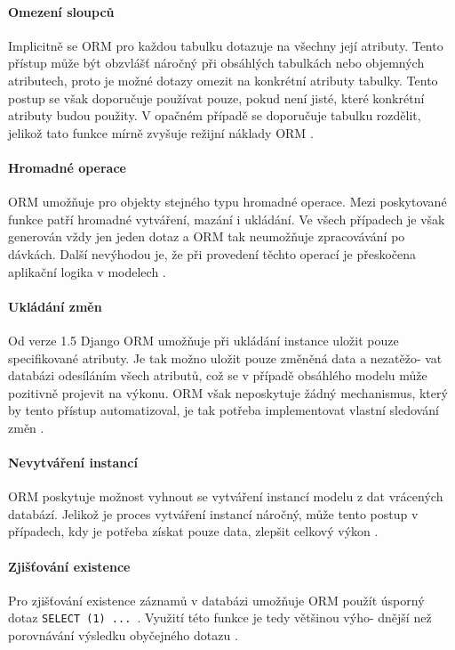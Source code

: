 \documentclass[ing,male,java,dept456]{diploma}						%
\begin{document}
\paragraph{Omezení sloupců}

Implicitně se ORM pro každou tabulku dotazuje na všechny její atributy. Tento přístup může být obzvlášť náročný při obsáhlých tabulkách nebo objemných atributech, proto je možné dotazy omezit na konkrétní atributy tabulky. Tento postup se však doporučuje používat pouze, pokud není jisté, které konkrétní atributy budou použity. V opačném případě se doporučuje tabulku rozdělit, jelikož tato funkce mírně zvyšuje režijní náklady ORM \cite{dj-querysets}. %

\paragraph{Hromadné operace}

ORM umožňuje pro objekty stejného typu hromadné operace. Mezi poskytované funkce patří hromadné vytváření, mazání i ukládání. Ve všech případech je však generován vždy jen jeden dotaz a ORM tak neumožňuje zpracovávání po dávkách. Další nevýhodou je, že při provedení těchto operací je přeskočena aplikační logika v modelech \cite{dj-queries}. %

\paragraph{Ukládání změn} Od verze 1.5 Django ORM umožňuje při ukládání instance uložit pouze specifikované atributy. Je tak možno uložit pouze změněná data a nezatěžo- vat databázi odesíláním všech atributů, což se v případě obsáhlého modelu může pozitivně projevit na výkonu. ORM však neposkytuje žádný mechanismus, který by tento přístup automatizoval, je tak potřeba implementovat vlastní sledování změn \cite{dj-save}.

\paragraph{Nevytváření instancí} ORM poskytuje možnost vyhnout se vytváření instancí modelu z dat vrácených databází. Jelikož je proces vytváření instancí náročný, může tento postup v případech, kdy je potřeba získat pouze data, zlepšit celkový výkon \cite{dj-querysets}. %

\paragraph{Zjišťování existence} Pro zjišťování existence záznamů v databázi umožňuje ORM použít úsporný dotaz \lstinline[style=inlinepython]|SELECT (1) ... |. Využití této funkce je tedy většinou výho- dnější než porovnávání výsledku obyčejného dotazu \cite{dj-querysets}. %
\end{document}
